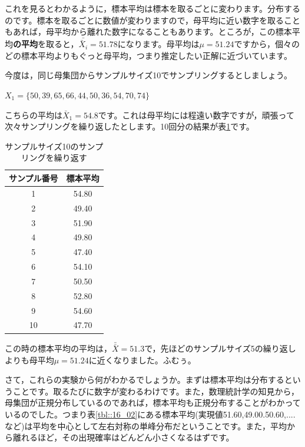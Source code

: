 \documentclass{ltjsbook}
\begin{document}
これを見るとわかるように，標本平均は標本を取るごとに変わります。分布するのです。標本を取るごとに数値が変わりますので，母平均に近い数字を取ることもあれば，母平均から離れた数字になることもあります。ところが，この標本平均{\bf の平均}を取ると，$\bar{\bar{X}_i}=51.78$になります。母平均は$\mu=51.24$ですから，個々のどの標本平均よりもぐっと母平均，つまり推定したい正解に近づいています。

今度は，同じ母集団からサンプルサイズ10でサンプリングするとしましょう。
\begin{tcolorbox}
  $ X_1=\{50, 39, 65, 66, 44, 50, 36, 54, 70, 74\}$
\end{tcolorbox}
こちらの平均は$\bar{X}_1=54.8$です。これは母平均には程遠い数字ですが，頑張って次々サンプリングを繰り返したとします。10回分の結果が表\ref{tbl::16_03}です。

\begin{table}[ht]
    \centering
    \caption{サンプルサイズ10のサンプリングを繰り返す}
    \begin{tabular}{cc}
      \hline
    サンプル番号 & 標本平均 \\ 
      \hline
      1 & 54.80 \\ 
      2 & 49.40 \\ 
      3 & 51.90 \\ 
      4 & 49.80 \\ 
      5 & 47.40 \\ 
      6 & 54.10 \\ 
      7 & 50.50 \\ 
      8 & 52.80 \\ 
      9 & 54.60 \\ 
      10 & 47.70 \\ 
       \hline
    \end{tabular}
    \label{tbl::16_03}
    \end{table}

この時の標本平均の平均は，$\bar{\bar{X}}=51.3$で，先ほどのサンプルサイズ5の繰り返しよりも母平均$\mu=51.24$に近くなりました。ふむぅ。

さて，これらの実験から何がわかるでしょうか。まずは標本平均は分布するということです。取るたびに数字が変わるわけです。また，数理統計学の知見から，母集団が正規分布しているのであれば，標本平均も正規分布することがわかっているのでした。つまり表\ref{tbl::16_02}にある標本平均(実現値51.60,49.00.50.60,....など)は平均を中心として左右対称の単峰分布だということです。また，平均から離れるほど，その出現確率はどんどん小さくなるはずです。
\end{document}

